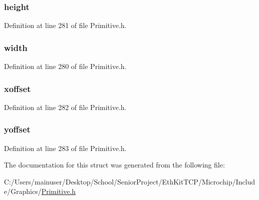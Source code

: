 \subsubsection[{height}]{ height}\label{struct_p_u_t_i_m_a_g_e___p_a_r_a_m_a919b3b1495d055253ab29ef130f6d9cf}


Definition at line 281 of file Primitive.\+h.

\hypertarget{struct_p_u_t_i_m_a_g_e___p_a_r_a_m_a1fd31a71d8ffffeeacaa6eef4782ee24}{}
\subsubsection[{width}]{ width}\label{struct_p_u_t_i_m_a_g_e___p_a_r_a_m_a1fd31a71d8ffffeeacaa6eef4782ee24}


Definition at line 280 of file Primitive.\+h.

\hypertarget{struct_p_u_t_i_m_a_g_e___p_a_r_a_m_a7fc8c844e703cb6583aac512ef974c46}{}
\subsubsection[{xoffset}]{ xoffset}\label{struct_p_u_t_i_m_a_g_e___p_a_r_a_m_a7fc8c844e703cb6583aac512ef974c46}


Definition at line 282 of file Primitive.\+h.

\hypertarget{struct_p_u_t_i_m_a_g_e___p_a_r_a_m_ab3eff91c1fe4033ba936e0859ba092da}{}
\subsubsection[{yoffset}]{ yoffset}\label{struct_p_u_t_i_m_a_g_e___p_a_r_a_m_ab3eff91c1fe4033ba936e0859ba092da}


Definition at line 283 of file Primitive.\+h.



The documentation for this struct was generated from the following file\+:\begin{DoxyCompactItemize}
\item 
C\+:/\+Users/mainuser/\+Desktop/\+School/\+Senior\+Project/\+Eth\+Kit\+T\+C\+P/\+Microchip/\+Include/\+Graphics/\hyperlink{_primitive_8h}{Primitive.\+h}\end{DoxyCompactItemize}
